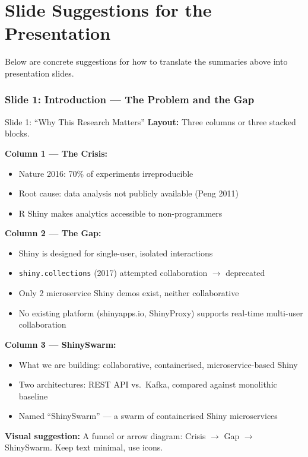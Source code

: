 \documentclass[12pt,a4paper]{article}
\begin{document}
\part{Slide Suggestions for the Presentation}

Below are concrete suggestions for how to translate the summaries above into presentation slides.

\section{Slide 1: Introduction --- The Problem and the Gap}

\begin{slidebox}{Slide 1: ``Why This Research Matters''}
\textbf{Layout:} Three columns or three stacked blocks.

\textbf{Column 1 --- The Crisis:}
\begin{itemize}[nosep]
  \item Nature 2016: 70\% of experiments irreproducible
  \item Root cause: data analysis not publicly available (Peng 2011)
  \item R Shiny makes analytics accessible to non-programmers
\end{itemize}

\textbf{Column 2 --- The Gap:}
\begin{itemize}[nosep]
  \item Shiny is designed for single-user, isolated interactions
  \item \texttt{shiny.collections} (2017) attempted collaboration $\rightarrow$ deprecated
  \item Only 2 microservice Shiny demos exist, neither collaborative
  \item No existing platform (shinyapps.io, ShinyProxy) supports real-time multi-user collaboration
\end{itemize}

\textbf{Column 3 --- ShinySwarm:}
\begin{itemize}[nosep]
  \item What we are building: collaborative, containerised, microservice-based Shiny
  \item Two architectures: REST API vs.\ Kafka, compared against monolithic baseline
  \item Named ``ShinySwarm'' --- a swarm of containerised Shiny microservices
\end{itemize}

\textbf{Visual suggestion:} A funnel or arrow diagram: Crisis $\rightarrow$ Gap $\rightarrow$ ShinySwarm. Keep text minimal, use icons.
\end{slidebox}
\end{document}
